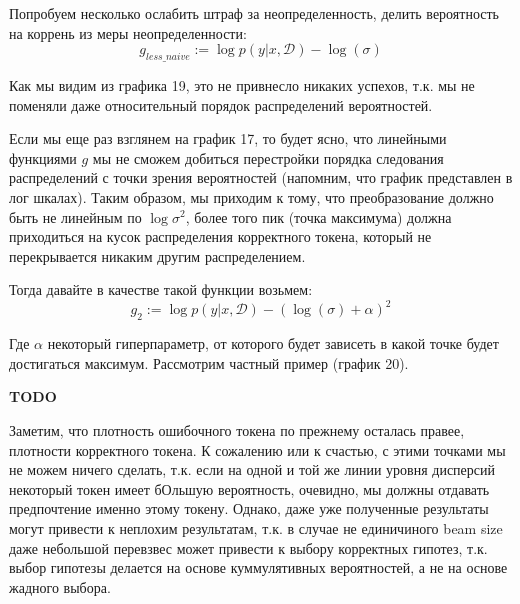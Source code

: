 \documentclass[a4paper,14pt]{extarticle}
\begin{document}
	Попробуем несколько ослабить штраф за неопределенность, делить вероятность на коррень из меры неопределенности:
	\begin{equation}
		g_{less\_naive} := \log p(y | x, \mathcal{D}) - \log(\sigma)
	\end{equation}
	
	Как мы видим из графика 19, это не привнесло никаких успехов, т.к. мы не поменяли даже относительный порядок распределений вероятностей.
	
	Если мы еще раз взглянем на график 17, то будет ясно, что линейными функциями $g$ мы не сможем добиться перестройки порядка следования распределений с точки зрения вероятностей (напомним, что график представлен в лог шкалах). Таким образом, мы приходим к тому, что преобразование должно быть не линейным по $\log \sigma^2$, более того пик (точка максимума) должна приходиться на кусок распределения корректного токена, который не перекрывается никаким другим распределением.
	
	Тогда давайте в качестве такой функции возьмем:
	\begin{equation}
		g_{2} := \log p(y | x, \mathcal{D}) - (\log(\sigma) + \alpha)^2
	\end{equation}
	
	 Где $\alpha$ некоторый гиперпараметр, от которого будет зависеть в какой точке будет достигаться максимум. Рассмотрим частный пример (график 20).
	 
	 \begin{figure}[t]
	\end{figure}
	
	\textbf{TODO}
	
	Заметим, что плотность ошибочного токена по прежнему осталась правее, плотности корректного токена. К сожалению или к счастью, с этими точками мы не можем ничего сделать, т.к. если на одной и той же линии уровня дисперсий некоторый токен имеет бОльшую вероятность, очевидно, мы должны отдавать предпочтение именно этому токену. Однако, даже уже полученные результаты могут привести к неплохим результатам, т.к. в случае не единичиного beam size даже небольшой перевзвес может привести к выбору корректных гипотез, т.к. выбор гипотезы делается на основе куммулятивных вероятностей, а не на основе жадного выбора.
\end{document}
